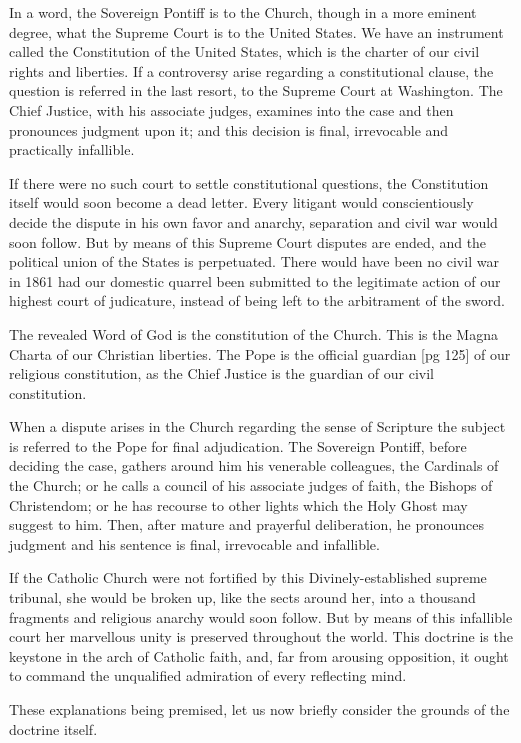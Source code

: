 In a word, the Sovereign Pontiff is to the
Church, though in a more eminent degree, what
the Supreme Court is to the United States. We
have an instrument called the Constitution of the
United States, which is the charter of our civil
rights and liberties. If a controversy arise regarding
a constitutional clause, the question is referred
in the last resort, to the Supreme Court at Washington.
The Chief Justice, with his associate
judges, examines into the case and then pronounces
judgment upon it; and this decision is final, irrevocable
and practically infallible.

If there were no such court to settle constitutional
questions, the Constitution itself would soon
become a dead letter. Every litigant would conscientiously
decide the dispute in his own favor
and anarchy, separation and civil war would soon
follow. But by means of this Supreme Court disputes
are ended, and the political union of the
States is perpetuated. There would have been no
civil war in 1861 had our domestic quarrel been
submitted to the legitimate action of our highest
court of judicature, instead of being left to the
arbitrament of the sword.

The revealed Word of God is the constitution
of the Church. This is the Magna Charta of our
Christian liberties. The Pope is the official guardian
[pg 125]
of our religious constitution, as the Chief
Justice is the guardian of our civil constitution.

When a dispute arises in the Church regarding
the sense of Scripture the subject is referred to
the Pope for final adjudication. The Sovereign
Pontiff, before deciding the case, gathers around
him his venerable colleagues, the Cardinals of the
Church; or he calls a council of his associate
judges of faith, the Bishops of Christendom; or he
has recourse to other lights which the Holy Ghost
may suggest to him. Then, after mature and
prayerful deliberation, he pronounces judgment
and his sentence is final, irrevocable and infallible.

If the Catholic Church were not fortified by this
Divinely-established supreme tribunal, she would
be broken up, like the sects around her, into a
thousand fragments and religious anarchy would
soon follow. But by means of this infallible court
her marvellous unity is preserved throughout the
world. This doctrine is the keystone in the arch
of Catholic faith, and, far from arousing opposition,
it ought to command the unqualified admiration
of every reflecting mind.

These explanations being premised, let us now
briefly consider the grounds of the doctrine itself.

